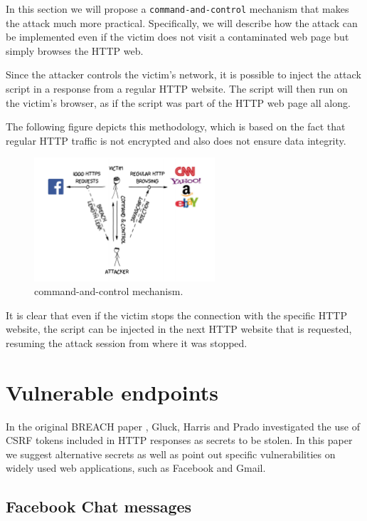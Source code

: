 In this section we will propose a \texttt{command-and-control} mechanism that
makes the attack much more practical. Specifically, we will describe how the
attack can be implemented even if the victim does not visit a contaminated web
page but simply browses the HTTP web.

Since the attacker controls the victim's network, it is possible to inject the
attack script in a response from a regular HTTP website. The script will then
run on the victim's browser, as if the script was part of the HTTP web page all
along.

The following figure depicts this methodology, which is based on the fact that
regular HTTP traffic is not encrypted and also does not ensure data integrity.

\begin{figure}[h] \caption{command-and-control mechanism.} \centering
\includegraphics[width=0.6\textwidth]{diagrams/breach_mitm.png}\end{figure}

It is clear that even if the victim stops the connection with the specific HTTP
website, the script can be injected in the next HTTP website that is requested,
resuming the attack session from where it was stopped.

\section{Vulnerable endpoints}\label{sec:vulnerabilities}

In the original BREACH paper \cite{breach}, Gluck, Harris and Prado investigated
the use of CSRF tokens included in HTTP responses as secrets to be stolen.
In this paper we suggest alternative secrets as well as point out specific
vulnerabilities on widely used web applications, such as Facebook and Gmail.

\subsection{Facebook Chat messages}\label{subsec:fb}

